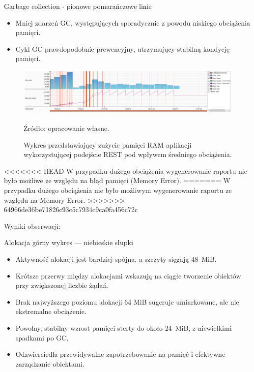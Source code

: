 \documentclass[runningheads,12pt]{llncs}
\begin{document}
Garbage collection - pionowe pomarańczowe linie

\begin{itemize}
  \item Mniej zdarzeń GC, występujących sporadycznie z powodu niskiego obciążenia pamięci.
  \item Cykl GC prawdopodobnie prewencyjny, utrzymujący stabilną kondycję pamięci.
\end{itemize}

\newpage

\begin{figure}
    \includegraphics[width=\linewidth]{images/rest-memory-middle-graph.jpg}
    \caption{Wykres przedstawiający zużycie pamięci RAM aplikacji wykorzystującej podejście REST pod wpływem średniego obciążenia.} \label{fig1}
    \vspace{0.5em}
    {\small Źródło: opracowanie własne.}
\end{figure}

<<<<<<< HEAD
W przypadku dużego obciążenia wygenerowanie raportu nie było możliwe ze względu na błąd pamięci (Memory Error).
=======
W przypadku dużego obciążenia nie było możliwym wygenerowanie raportu ze względu na Memory Error.
>>>>>>> 64966de36be71826c93c5c7934c9ca0fa456c72c

Wyniki obserwacji:

Alokacja górny wykres — niebieskie słupki

\begin{itemize}
  \item Aktywność alokacji jest bardziej spójna, a szczyty sięgają 48~MiB.
  \item Krótsze przerwy między alokacjami wskazują na ciągłe tworzenie obiektów przy zwiększonej liczbie żądań.
  \item Brak najwyższego poziomu alokacji 64 MiB sugeruje umiarkowane, ale nie ekstremalne obciążenie.
\end{itemize}

\begin{itemize}
  \item Powolny, stabilny wzrost pamięci sterty do około 24~MiB, z niewielkimi spadkami po GC.
  \item Odzwierciedla przewidywalne zapotrzebowanie na pamięć i efektywne zarządzanie obiektami.
\end{itemize}
\end{document}
